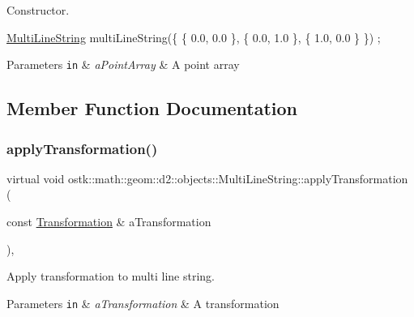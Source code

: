 Constructor. 


\begin{DoxyCode}
\hyperlink{classostk_1_1math_1_1geom_1_1d2_1_1objects_1_1_multi_line_string_a5a30febbcbc28097e34b6f2f3f456b79}{MultiLineString} multiLineString(\{ \{ 0.0, 0.0 \}, \{ 0.0, 1.0 \}, \{ 1.0, 0.0 \} \}) ;
\end{DoxyCode}



\begin{DoxyParams}[1]{Parameters}
\mbox{\tt in}  & {\em a\+Point\+Array} & A point array \\
\hline
\end{DoxyParams}


\subsection{Member Function Documentation}
\mbox{\label{classostk_1_1math_1_1geom_1_1d2_1_1objects_1_1_multi_line_string_ada5fe5a183b6628831867b416901459e}} 
\subsubsection{\texorpdfstring{apply\+Transformation()}{applyTransformation()}}
{\footnotesize\ttfamily virtual void ostk\+::math\+::geom\+::d2\+::objects\+::\+Multi\+Line\+String\+::apply\+Transformation (\begin{DoxyParamCaption}\item[{const \hyperlink{classostk_1_1math_1_1geom_1_1d2_1_1_transformation}{Transformation} \&}]{a\+Transformation }\end{DoxyParamCaption})\hspace{0.3cm}{\ttfamily [override]}, {\ttfamily [virtual]}}



Apply transformation to multi line string. 


\begin{DoxyParams}[1]{Parameters}
\mbox{\tt in}  & {\em a\+Transformation} & A transformation \\
\hline
\end{DoxyParams}


